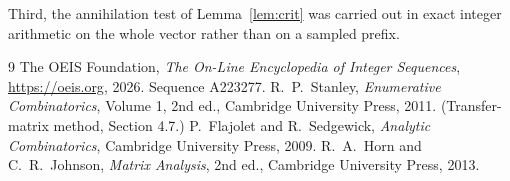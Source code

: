 \documentclass[11pt,a4paper]{article}
\theoremstyle{plain}
\theoremstyle{definition}
\begin{document}
Third, the annihilation test of Lemma~\ref{lem:crit} was carried out in exact integer
arithmetic on the whole vector rather than on a sampled prefix.

\begin{thebibliography}{9}
 The OEIS Foundation, \emph{The On-Line Encyclopedia of Integer
Sequences}, \url{https://oeis.org}, 2026. Sequence A223277.
 R.~P.~Stanley, \emph{Enumerative Combinatorics}, Volume 1, 2nd ed.,
Cambridge University Press, 2011. (Transfer-matrix method, Section 4.7.)
 P.~Flajolet and R.~Sedgewick, \emph{Analytic Combinatorics}, Cambridge
University Press, 2009.
 R.~A.~Horn and C.~R.~Johnson, \emph{Matrix Analysis}, 2nd ed., Cambridge
University Press, 2013.
\end{thebibliography}
\end{document}
